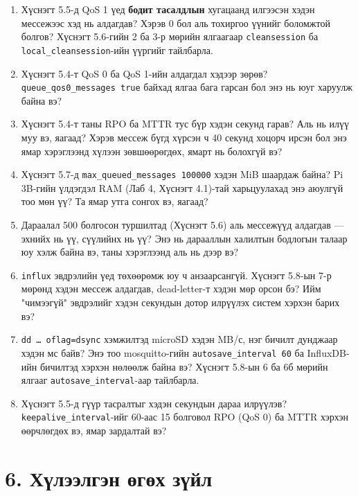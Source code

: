 \begin{enumerate}
\def\labelenumi{\arabic{enumi}.}
\item
  Хүснэгт 5.5-д QoS 1 үед \textbf{бодит тасалдлын} хугацаанд илгээсэн хэдэн мессежээс хэд нь алдагдав? Хэрэв 0 бол аль тохиргоо үүнийг боломжтой болгов? Хүснэгт 5.6-гийн 2 ба 3-р мөрийн ялгаагаар \texttt{cleansession} ба \texttt{local\_\allowbreak{}cleansession}-ийн үүргийг тайлбарла.
\item
  Хүснэгт 5.4-т QoS 0 ба QoS 1-ийн алдагдал хэдээр зөрөв? \texttt{queue\_\allowbreak{}qos0\_\allowbreak{}messages\ true} байхад ялгаа бага гарсан бол энэ нь юуг харуулж байна вэ?
\item
  Хүснэгт 5.4-т таны RPO ба MTTR тус бүр хэдэн секунд гарав? Аль нь илүү муу вэ, яагаад? Хэрэв мессеж бүгд хүрсэн ч 40 секунд хоцорч ирсэн бол энэ ямар хэрэглээнд хүлээн зөвшөөрөгдөх, ямарт нь болохгүй вэ?
\item
  Хүснэгт 5.7-д \texttt{max\_\allowbreak{}queued\_\allowbreak{}messages\ 100000} хэдэн MiB шаардаж байна? Pi 3B-гийн үлдэгдэл RAM (Лаб 4, Хүснэгт 4.1)-тай харьцуулахад энэ аюулгүй тоо мөн үү? Та ямар утга сонгох вэ, яагаад?
\item
  Дараалал 500 болгосон туршилтад (Хүснэгт 5.6) аль мессежүүд алдагдав --- эхнийх нь үү, сүүлийнх нь үү? Энэ нь дарааллын халилтын бодлогын талаар юу хэлж байна вэ, таны хэрэглээнд аль нь дээр вэ?
\item
  \texttt{influx} эвдрэлийн үед төхөөрөмж юу ч анзаарсангүй. Хүснэгт 5.8-ын 7-р мөрөнд хэдэн мессеж алдагдав, dead-letter-т хэдэн мөр орсон бэ? Ийм "чимээгүй" эвдрэлийг хэдэн секундын дотор илрүүлэх систем хэрхэн барих вэ?
\item
  \texttt{dd\ \ldots{}\ oflag=\allowbreak{}dsync} хэмжилтэд microSD хэдэн MB/с, нэг бичилт дунджаар хэдэн мс байв? Энэ тоо mosquitto-гийн \texttt{autosave\_\allowbreak{}interval\ 60} ба InfluxDB-ийн бичилтэд хэрхэн нөлөөлж байна вэ? Хүснэгт 5.8-ын 6 ба 6б мөрийн ялгааг \texttt{autosave\_\allowbreak{}interval}-аар тайлбарла.
\item
  Хүснэгт 5.5-д гүүр тасралтыг хэдэн секундын дараа илрүүлэв? \texttt{keepalive\_\allowbreak{}interval}-ийг 60-аас 15 болговол RPO (QoS 0) ба MTTR хэрхэн өөрчлөгдөх вэ, ямар зардалтай вэ?
\end{enumerate}

\hypertarget{ux445ux4afux43bux44dux44dux43bux433ux44dux43d-ux4e9ux433ux4e9ux445-ux437ux4afux439ux43b}{%
\section{6. Хүлээлгэн өгөх зүйл}\label{ux445ux4afux43bux44dux44dux43bux433ux44dux43d-ux4e9ux433ux4e9ux445-ux437ux4afux439ux43b}}

